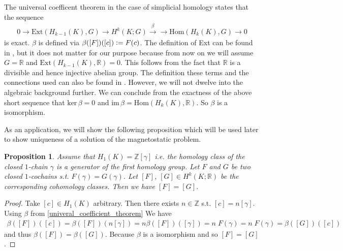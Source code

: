 \documentclass[12pt,a4paper]{article}
\newtheorem{proposition}{Proposition}
\theoremstyle{definition}
\newcommand{\integers}{\mathbb{Z}}
\newcommand{\real}{\mathbb{R}}
\begin{document}
The universal coefficent theorem in the case of simplicial homology states
that the sequence 
\begin{align}
    0 \rightarrow \text{Ext}(H_{k-1}(K),G) \rightarrow 
    H^k(K;G) \xrightarrow{\beta} \rightarrow \text{Hom}(H_k(K),G) 
    \rightarrow 0 \label{univeral_coefficient_theorem}
\end{align}
is exact. 
$\beta$ is defined via $\beta([F])([c]) \vcentcolon= F(c)$.
The definition of Ext can be found in \cite{topology_and_geometry},
but it does not matter for our purpose because from now on we will assume
$G = \real$ and
$\text{Ext}(H_{k-1}(K),\real) = 0$. This follows from the fact that 
$\real$ is a divisible and hence injective abelian group. The definition 
these terms and the connections used can also be found in 
\cite[Ch.\,V.6]{topology_and_geometry}. However, we will not dwelve into the 
algebraic background further. We can conclude from the exactness of the 
above short sequence that $\text{ker}\,\beta = 0$ and 
$\text{im}\,\beta = \text{Hom}(H_k(K),\real)$. So $\beta$ is a isomorphism.


As an application, we will show the following proposition which will be used
later to show uniqueness of a solution of the magnetostatic problem.

\begin{proposition}\label{uniqueness_cochain}
    Assume that $H_1(K) = \integers [\gamma]$ i.e. the homology class of the 
    closed $1$-chain $\gamma$ is a generator of the first homology group. 
    Let $F$ and $G$ be two closed $1$-cochains s.t. $F(\gamma) = G(\gamma)$.
    Let $[F]$, $[G] \in H^k(K;\real)$ be the corresponding cohomology classes. 
    Then we have $[F] = [G]$.
\end{proposition}
\begin{proof}
    Take $[c] \in H_1(K)$ arbitrary. Then there exists  $n \in \integers$ s.t.
    $[c] = n [\gamma]$.
    Using $\beta$ from \ref{univeral_coefficient_theorem}
    We have
    \begin{align*}
        \beta([F])([c]) = \beta([F])(n [\gamma]) 
        = n \beta([F])([\gamma]) = n \; F(\gamma) = n \; F(\gamma) = 
        \beta([G])([c])
    \end{align*}
    and thus $\beta([F]) = \beta([G])$. Because $\beta$ is a isomorphism
    and so $[F] = [G]$.
\end{proof}
\end{document}
